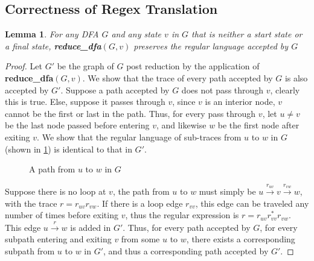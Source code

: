 \documentclass[preprint,12pt]{elsarticle}
\newtheorem{lemma}{Lemma}[section]
\theoremstyle{definition}
\theoremstyle{remark}
\begin{document}
\subsection{Correctness of Regex Translation}
\begin{lemma}
    For any DFA $G$ and any state $v$ in $G$ that is neither a start state or a final state, \textbf{reduce\_dfa}$(G, v)$ preserves the regular language accepted by $G$
\end{lemma}
\begin{proof}
    Let $G'$ be the graph of $G$ post reduction by the application of \textbf{reduce\_dfa}$(G, v)$. We show that the trace of every path accepted by $G$ is also accepted by $G'$. Suppose a path accepted by $G$ does not pass through $v$, clearly this is true. Else, suppose it passes through $v$, since $v$ is an interior node, $v$ cannot be the first or last in the path. Thus, for every pass through $v$, let $u\neq v$ be the last node passed before entering $v$, and likewise $w$ be the first node after exiting $v$. We show that the regular language of sub-traces from $u$ to $w$ in $G$ (shown in \cref{fig:uvw-dfa}) is identical to that in $G'$.
    \begin{figure}[h!]
        \centering
        \caption{A path from $u$ to $w$ in $G$}
        \label{fig:uvw-dfa}
    \end{figure}
    Suppose there is no loop at $v$, the path from $u$ to $w$ must simply be $u\xrightarrow{r_{uv}}v\xrightarrow{r_{vw}}w$, with the trace $r=r_{uv}r_{vw}$. If there is a loop edge $r_{vv}$, this edge can be traveled any number of times before exiting $v$, thus the regular expression is $r=r_{uv}r_{vv}^*r_{vw}$. This edge $u\xrightarrow{r}w$ is added in $G'$. Thus, for every path accepted by $G$, for every subpath entering and exiting $v$ from some $u$ to $w$, there exists a corresponding subpath from $u$ to $w$ in $G'$, and thus a corresponding path accepted by $G'$.
\end{proof}
\end{document}

